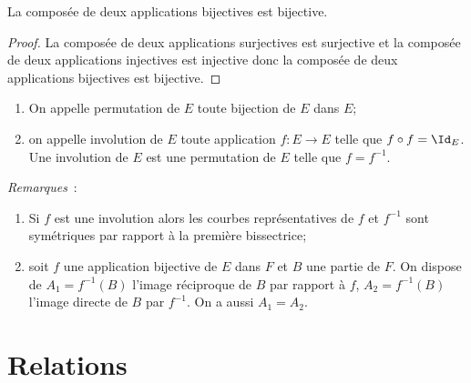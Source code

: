 %
\begin{prop}
La composée de deux applications bijectives est bijective.
\end{prop}
\begin{proof}
La composée de deux applications surjectives est surjective et la composée de deux applications injectives est injective donc la composée de deux applications bijectives est bijective.
\end{proof}
%
\begin{defdef}
\begin{enumerate}
\item On appelle permutation de $E$ toute bijection de $E$ dans $E$;
\item on appelle involution de $E$ toute application $f: E \longrightarrow E$ telle que $f \circ f=\Id_E$. Une involution de $E$ est une permutation de $E$ telle que $f=f^{-1}$.
\end{enumerate}
\end{defdef}
%
\emph{Remarques}~:
\begin{enumerate}
\item Si $f$ est une involution alors les courbes représentatives de $f$ et $f^{-1}$ sont symétriques par rapport à la première bissectrice;
\item soit $f$ une application bijective de $E$ dans $F$ et $B$ une partie de $F$. On dispose de $A_1=f^{-1}(B)$ l'image réciproque de $B$ par rapport à $f$, $A_2=f^{-1}(B)$ l'image directe de $B$ par $f^{-1}$. On a aussi $A_1=A_2$.
\end{enumerate}
%
\section{Relations}
\label{chap3-sec:relations}
